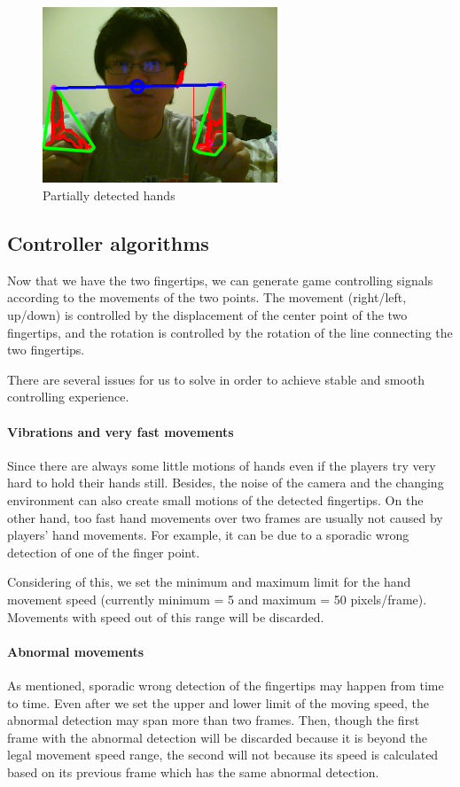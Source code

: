 \documentclass[10pt,twocolumn,letterpaper]{article}
\begin{document}
\begin{figure}[h]
\centering
\includegraphics[width=7cm]{partialhand.png}
\caption{Partially detected hands}
\label{fig:partial hand}
\end{figure}

\subsection{Controller algorithms}
Now that we have the two fingertips, we can generate game 
controlling signals according to the movements of the two points. 
The movement (right/left, up/down) is controlled by the 
displacement of the center point of the two fingertips, and 
the rotation is controlled by the rotation of the line connecting 
the two fingertips. 

There are several issues for us to solve in order to achieve stable and smooth controlling experience.

\paragraph{Vibrations and very fast movements} 
Since there are always some little motions of hands even if the players try very hard 
to hold their hands still. Besides, the noise of the camera and the changing environment 
can also create small motions of the detected fingertips. On the other hand, too fast 
hand movements over two frames are usually not caused by players' hand movements. 
For example, it can be due to a sporadic wrong detection of one of the finger point. 

Considering of this, we set the minimum and maximum limit for the hand movement 
speed (currently minimum = 5 and maximum = 50 pixels/frame). Movements with speed 
out of this range will be discarded.

\paragraph{Abnormal movements}
As mentioned, sporadic wrong detection of the fingertips may happen from time 
to time. Even after we set the upper and lower limit of the moving speed, the 
abnormal detection may span more than two frames. Then, though the first frame with 
the abnormal detection will be discarded because it is beyond the legal movement 
speed range, the second will not because its speed is calculated based on its 
previous frame which has the same abnormal detection.
\end{document}
